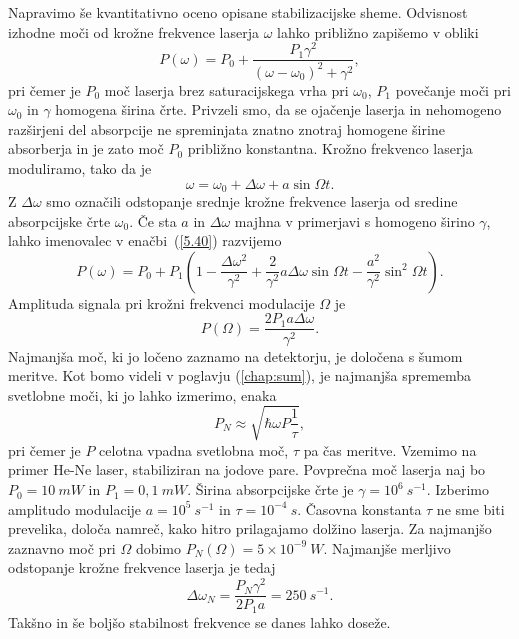 Napravimo še kvantitativno oceno opisane stabilizacijske sheme. Odvisnost
izhodne moči od krožne frekvence laserja $\omega$ lahko približno zapišemo v
obliki 
\begin{equation}  
\label{5.40}
P(\omega)=P_0 + \frac{P_1\gamma^2}{(\omega- \omega_0)^2+\gamma^2},
\end{equation}
pri čemer je $P_0$ moč laserja brez saturacijskega vrha pri $\omega_0$, $P_1$ 
povečanje moči pri $\omega_0$ in $\gamma$ homogena širina črte. Privzeli  
smo, da se ojačenje laserja in nehomogeno razširjeni del absorpcije ne 
spreminjata znatno znotraj homogene širine absorberja in je zato moč $P_0$ 
približno konstantna. Krožno frekvenco laserja moduliramo, tako da je 
\begin{equation}  
\label{5.41}
\omega=\omega_0+\Delta\omega+a \sin \Omega t.
\end{equation}
Z $\Delta\omega$ smo označili odstopanje srednje krožne frekvence laserja od
sredine absorpcijske črte $\omega_0$. Če sta $a$ in $\Delta\omega$ majhna v
primerjavi s homogeno širino $\gamma$, lahko imenovalec v enačbi~(\ref{5.40})
razvijemo
\begin{equation}  
\label{5.42}
P(\omega)=P_0+P_1 \left(1-\frac{\Delta\omega^2}{\gamma^2} +\frac{2}{\gamma^2} a
\Delta\omega \sin\Omega t - \frac{a^2}{\gamma^2}\sin^2\Omega t\right).
\end{equation}
Amplituda signala pri krožni frekvenci modulacije $\Omega$ je 
\begin{equation}
P(\Omega) = \frac{2P_1 a \Delta\omega}{\gamma^2}. 
\end{equation}
Najmanjša moč, ki jo ločeno zaznamo na detektorju, je določena s šumom 
meritve. Kot bomo videli v poglavju (\ref{chap:sum}), je najmanjša 
sprememba svetlobne moči, ki jo lahko izmerimo, enaka 
\begin{equation}  
\label{5.43}
P_N\approx \sqrt{\hbar\omega P \frac{1}{\tau}},
\end{equation}
pri čemer je $P$ celotna vpadna svetlobna moč, $\tau$ pa čas
meritve. Vzemimo na primer He-Ne laser, stabiliziran na 
jodove pare. Povprečna moč laserja naj bo $P_0 = 10~\si{mW}$ in $P_1= 0,1~\si{mW}$. 
Širina absorpcijske črte je $\gamma= 10^6~\si{s}^{-1}$. Izberimo amplitudo 
modulacije $a=10^5~\si{s}^{-1}$ in $\tau=10^{-4}~\si{s}$. Časovna konstanta 
$\tau$ ne sme biti prevelika, določa namreč, kako hitro prilagajamo dolžino 
laserja. Za najmanjšo zaznavno moč pri $\Omega$ dobimo 
$P_N(\Omega) = 5\times10^{-9}~\si{W}$.
Najmanjše merljivo odstopanje krožne frekvence laserja je tedaj 
\begin{equation}  
\label{5.44}
\Delta\omega_N=\frac{P_N \gamma^2}{2P_1 a}=250~\si{s}^{-1}.
\end{equation}
Takšno in še boljšo stabilnost frekvence se danes lahko doseže. 


